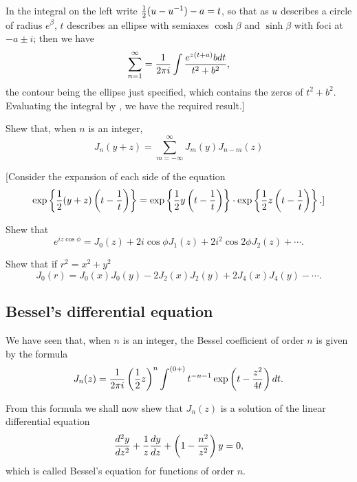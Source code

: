 \documentclass{book}
\begin{document}
%
%
In the integral on the left write $\frac{1}{2} (u - u^{-1}) - a = t$, so that as
$u$ describes a circle of radius $e^{\beta}$, $t$ describes an ellipse
with 
semiaxes $\cosh\beta$ and $\sinh\beta$ with foci at 
$-a \pm i$; then we have
$$
\sum_{n=1}^{\infty}
=
\frac{1}{2\pi i}
\int
\frac{ e^{z(t+a)}b d t  }{ t^2 + b^2  },
$$
the contour being the ellipse just specified, which contains the zeros
of $t^2 + b^2$. Evaluating the integral by 
, we have the required result.]
\begin{wandwexample}
  Shew that, when $n$ is an integer,
  $$
  J_n(y+z)
  =
  \sum_{m = -\infty}^{\infty} J_{m}(y) J_{n-m}(z)
  $$
\end{wandwexample}
[Consider the expansion of each side of the equation
$$
\exp \left\{  \frac{1}{2} (y+z) \left( t - \frac{1}{t} \right)   \right\}
=
\exp \left\{  \frac{1}{2} y \left( t - \frac{1}{t} \right)   \right\}
\cdot
\exp \left\{  \frac{1}{2} z \left( t - \frac{1}{t} \right)   \right\}.]
$$
\begin{wandwexample}
  Shew that 
$$
e^{i z \cos \phi}
= 
J_0(z)
+ 2 i \cos\phi J_1(z)
+ 2 i^2 \cos 2\phi J_2(z)
+ \cdots.
$$
\end{wandwexample}
\begin{wandwexample}
  Shew that if $r^2 = x^2 + y^2$
  $$
  J_0(r)
  =
  J_0(x)J_0(y)
  - 2 J_2(x) J_2(y)
  + 2 J_4(x) J_4(y)
  - \cdots .
  $$
\end{wandwexample}

\subsection{Bessel's differential equation}
We have seen that, when $n$ is an integer, the Bessel coefficient of
order $n$ is given by the formula
$$
J_n(z)
=
\frac{1}{2\pi i} 
\left( \frac{1}{2} z \right)^n
\int^{(0+)}
t^{-n-1}
\exp\left(  t - \frac{z^2}{4t}   \right)
d t.
$$

From this formula we shall now shew that $J_n(z)$ is a solution of the
linear differential equation
$$
\frac{d^2 y}{dz^2}
+ \frac{1}{z} \frac{dy}{dz}
+ \left(  1 - \frac{n^2}{z^2}   \right) y
= 0,
$$
which is called Bessel's equation for functions of order $n$.
\end{document}
